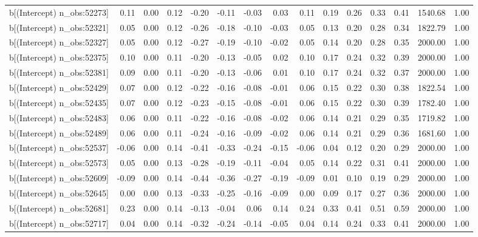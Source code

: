\begin{table}[ht]
\begin{tabular}{rrrrrrrrrrrrrrr}
  b[(Intercept) n\_obs:52273] & 0.11 & 0.00 & 0.12 & -0.20 & -0.11 & -0.03 & 0.03 & 0.11 & 0.19 & 0.26 & 0.33 & 0.41 & 1540.68 & 1.00 \\ 
  b[(Intercept) n\_obs:52321] & 0.05 & 0.00 & 0.12 & -0.26 & -0.18 & -0.10 & -0.03 & 0.05 & 0.13 & 0.20 & 0.28 & 0.34 & 1822.79 & 1.00 \\ 
  b[(Intercept) n\_obs:52327] & 0.05 & 0.00 & 0.12 & -0.27 & -0.19 & -0.10 & -0.02 & 0.05 & 0.14 & 0.20 & 0.28 & 0.35 & 2000.00 & 1.00 \\ 
  b[(Intercept) n\_obs:52375] & 0.10 & 0.00 & 0.11 & -0.20 & -0.13 & -0.05 & 0.02 & 0.10 & 0.17 & 0.24 & 0.32 & 0.39 & 2000.00 & 1.00 \\ 
  b[(Intercept) n\_obs:52381] & 0.09 & 0.00 & 0.11 & -0.20 & -0.13 & -0.06 & 0.01 & 0.10 & 0.17 & 0.24 & 0.32 & 0.37 & 2000.00 & 1.00 \\ 
  b[(Intercept) n\_obs:52429] & 0.07 & 0.00 & 0.12 & -0.22 & -0.16 & -0.08 & -0.01 & 0.06 & 0.15 & 0.22 & 0.30 & 0.38 & 1822.54 & 1.00 \\ 
  b[(Intercept) n\_obs:52435] & 0.07 & 0.00 & 0.12 & -0.23 & -0.15 & -0.08 & -0.01 & 0.06 & 0.15 & 0.22 & 0.30 & 0.39 & 1782.40 & 1.00 \\ 
  b[(Intercept) n\_obs:52483] & 0.06 & 0.00 & 0.11 & -0.22 & -0.16 & -0.08 & -0.02 & 0.06 & 0.14 & 0.21 & 0.29 & 0.35 & 1719.82 & 1.00 \\ 
  b[(Intercept) n\_obs:52489] & 0.06 & 0.00 & 0.11 & -0.24 & -0.16 & -0.09 & -0.02 & 0.06 & 0.14 & 0.21 & 0.29 & 0.36 & 1681.60 & 1.00 \\ 
  b[(Intercept) n\_obs:52537] & -0.06 & 0.00 & 0.14 & -0.41 & -0.33 & -0.24 & -0.15 & -0.06 & 0.04 & 0.12 & 0.20 & 0.29 & 2000.00 & 1.00 \\ 
  b[(Intercept) n\_obs:52573] & 0.05 & 0.00 & 0.13 & -0.28 & -0.19 & -0.11 & -0.04 & 0.05 & 0.14 & 0.22 & 0.31 & 0.41 & 2000.00 & 1.00 \\ 
  b[(Intercept) n\_obs:52609] & -0.09 & 0.00 & 0.14 & -0.44 & -0.36 & -0.27 & -0.19 & -0.09 & 0.01 & 0.10 & 0.19 & 0.29 & 2000.00 & 1.00 \\ 
  b[(Intercept) n\_obs:52645] & 0.00 & 0.00 & 0.13 & -0.33 & -0.25 & -0.16 & -0.09 & 0.00 & 0.09 & 0.17 & 0.27 & 0.36 & 2000.00 & 1.00 \\ 
  b[(Intercept) n\_obs:52681] & 0.23 & 0.00 & 0.14 & -0.13 & -0.04 & 0.06 & 0.14 & 0.24 & 0.33 & 0.41 & 0.51 & 0.59 & 2000.00 & 1.00 \\ 
  b[(Intercept) n\_obs:52717] & 0.04 & 0.00 & 0.14 & -0.32 & -0.24 & -0.14 & -0.05 & 0.04 & 0.14 & 0.24 & 0.33 & 0.41 & 2000.00 & 1.00 \\ 

\end{tabular}
\end{table}
